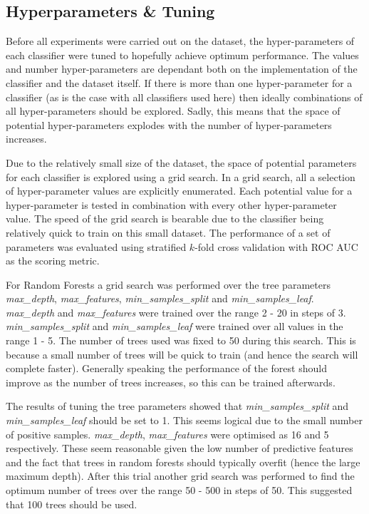 \documentclass[journal]{IEEEtran}
\begin{document}
\subsection{Hyperparameters \& Tuning}
\label{subsec:tuning}

Before all experiments were carried out on the dataset, the hyper-parameters of each classifier were tuned to hopefully achieve optimum performance. The values and number hyper-parameters are dependant both on the implementation of the classifier and the dataset itself. If there is more than one hyper-parameter for a classifier (as is the case with all classifiers used here) then ideally combinations of all hyper-parameters should be explored. Sadly, this means that the space of potential hyper-parameters explodes with the number of hyper-parameters increases.

Due to the relatively small size of the dataset, the space of potential parameters for each classifier is explored using a grid search. In a grid search, all a selection of hyper-parameter values are explicitly enumerated. Each potential value for a hyper-parameter is tested in combination with every other hyper-parameter value. The speed of the grid search is bearable due to the classifier being relatively quick to train on this small dataset. The performance of a set of parameters was evaluated using stratified $k$-fold cross validation with ROC AUC as the scoring metric.

For Random Forests a grid search was performed over the tree parameters \textit{max\_depth}, \textit{max\_features}, \textit{min\_samples\_split} and \textit{min\_samples\_leaf}. \textit{max\_depth} and \textit{max\_features} were trained over the range 2 - 20 in steps of 3. \textit{min\_samples\_split} and \textit{min\_samples\_leaf} were trained over all values in the range 1 - 5. The number of trees used was fixed to 50 during this search. This is because a small number of trees will be quick to train (and hence the search will complete faster). Generally speaking the performance of the forest should improve as the number of trees increases, so this can be trained afterwards.

The results of tuning the tree parameters showed that \textit{min\_samples\_split} and \textit{min\_samples\_leaf} should be set to 1. This seems logical due to the small number of positive samples. \textit{max\_depth}, \textit{max\_features} were optimised as 16 and 5 respectively. These seem reasonable given the low number of predictive features and the fact that trees in random forests should typically overfit (hence the large maximum depth). After this trial another grid search was performed to find the optimum number of trees over the range 50 - 500 in steps of 50. This suggested that 100 trees should be used. 
\end{document}
